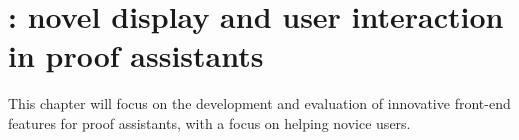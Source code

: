\chapter{\PeaCoq{}: novel display and user interaction in proof
assistants}\label{peacoq}

This chapter will focus on the development and evaluation of innovative
front-end features for proof assistants, with a focus on helping novice users.






